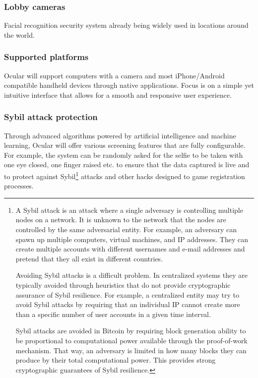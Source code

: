 \documentclass[12pt]{article}
\begin{document}
\subsubsection*{Lobby cameras}
Facial recognition security system already being widely used in locations around the world.

\subsubsection*{Supported platforms}

Ocular will support computers with a camera and most iPhone/Android compatible handheld devices through native applications. Focus is on a simple yet intuitive interface that allows for a smooth and responsive user experience.

\subsubsection*{Sybil attack protection}

Through advanced algorithms powered by artificial intelligence and machine learning, Ocular will offer various screening features that are fully configurable. For example, the system can be randomly asked for the selfie to be taken with one eye closed, one finger raised etc. to ensure that the data captured is live and to protect against Sybil\footnote{A Sybil attack is an attack where a single adversary is controlling multiple nodes on a network. It is unknown to the network that the nodes are controlled by the same adversarial entity. For example, an adversary can spawn up multiple computers, virtual machines, and IP addresses. They can create multiple accounts with different usernames and e-mail addresses and pretend that they all exist in different countries.

Avoiding Sybil attacks is a difficult problem. In centralized systems they are typically avoided through heuristics that do not provide cryptographic assurance of Sybil resilience. For example, a centralized entity may try to avoid Sybil attacks by requiring that an individual IP cannot create more than a specific number of user accounts in a given time interval.

Sybil attacks are avoided in Bitcoin by requiring block generation ability to be proportional to computational power available through the proof-of-work mechanism. That way, an adversary is limited in how many blocks they can produce by their total computational power. This provides strong cryptographic guarantees of Sybil resilience.} attacks and other hacks designed to game registration processes. 
\end{document}
